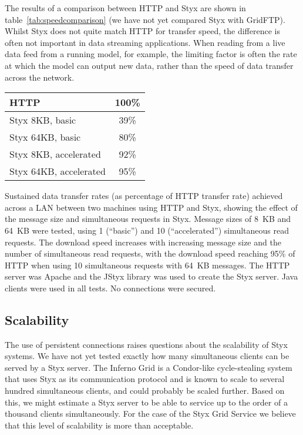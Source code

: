 \documentclass[a4paper]{article}
\makeatletter
\newenvironment{tablehere}
  {\def\@captype{table}}
  {}
\makeatother
\begin{document}
\begin{multicols}{2}
The results of a comparison between HTTP and Styx are shown in table~\ref{tab:speedcomparison} (we have not yet compared Styx with GridFTP).  Whilst Styx does not quite match HTTP for transfer speed, the difference is often not important in data streaming applications.  When reading from a live data feed from a running model, for example, the limiting factor is often the rate at which the model can output new data, rather than the speed of data transfer across the network.

\begin{tablehere}
\medskip
\begin{tabular}{|l|c|}
\hline
HTTP & 100\% \\ \hline
Styx 8KB, basic & 39\% \\ \hline
Styx 64KB, basic & 80\% \\ \hline
Styx 8KB, accelerated & 92\% \\ \hline
Styx 64KB, accelerated & 95\% \\ \hline
\end{tabular}
\caption{Sustained data transfer rates (as percentage of HTTP transfer rate) achieved across a LAN between two machines using HTTP and Styx, showing the effect of the message size and simultaneous requests in Styx.  Message sizes of 8~KB and 64~KB were tested, using 1 (``basic'') and 10 (``accelerated'') simultaneous read requests.  The download speed increases with increasing message size and the number of simultaneous read requests, with the download speed reaching 95\% of HTTP when using 10 simultaneous requests with 64~KB messages.  The HTTP server was Apache and the JStyx library was used to create the Styx server.  Java clients were used in all tests.  No connections were secured.} \label{tab:speedcomparison}
\end{tablehere}

\subsection{Scalability}
The use of persistent connections raises questions about the scalability of Styx systems.  We have not yet tested exactly how many simultaneous clients can be served by a Styx server.  The Inferno Grid is a Condor-like cycle-stealing system that uses Styx as its communication protocol and is known to scale to several hundred simultaneous clients, and could probably be scaled further.  Based on this, we might estimate a Styx server to be able to service up to the order of a thousand clients simultaneously.  For the case of the Styx Grid Service we believe that this level of scalability is more than acceptable.


\end{multicols}
\end{document}
